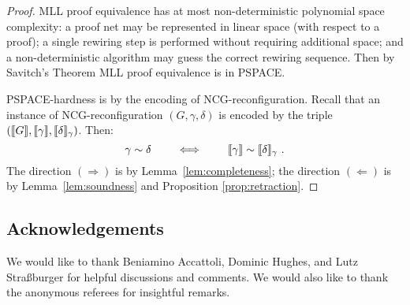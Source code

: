 \documentclass{lmcs}
\let\capsabbrev=\uppercase
\begin{document}
\begin{proof}
\capsabbrev{mll} proof equivalence has at most non-deterministic polynomial space complexity: a proof net may be represented in linear space (with respect to a proof); a single rewiring step is performed without requiring additional space; and a non-deterministic algorithm may guess the correct rewiring sequence.
%
Then by Savitch's Theorem \cite{Savitch-1970} \capsabbrev{mll} proof equivalence is in \capsabbrev{pspace}.


\capsabbrev{pspace}-hardness is by the encoding of \capsabbrev{ncg}-reconfiguration. Recall that an instance of \capsabbrev{ncg}-reconfiguration $(G,\gamma,\delta)$ is encoded by the triple $(\llbracket G\rrbracket,\llbracket\gamma\rrbracket,\llbracket\delta\rrbracket_\gamma)$. Then:
\[
	\gamma\perm\delta \qquad\iff\qquad \itn\gamma\perm\itn\delta_\gamma~.
\]
%
The direction $(\Rightarrow)$ is by Lemma~\ref{lem:completeness}; the direction $(\Leftarrow)$ is by Lemma~\ref{lem:soundness} and Proposition \ref{prop:retraction}.
\end{proof}



\subsection*{Acknowledgements}
We would like to thank Beniamino Accattoli, Dominic Hughes, and Lutz Stra{\ss}burger for helpful discussions and comments. We would also like to thank the anonymous referees for insightful remarks.



\end{document}
